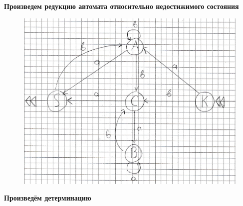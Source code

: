 \documentclass[a4paper, 14pt]{extarticle}
\begin{document}
\vfill

\newpage

\begin{center}
  \normalsize
  \bfseries
  Произведем редукцию автомата относительно недостижимого состояния
\end{center}

\begin{figure}[h]
  \centering
  \includegraphics[width=1\textwidth,height=1\textheight,keepaspectratio]{three}
\end{figure}

\newpage

\begin{center}
  \normalsize
  \bfseries
  Произведём детерминацию
\end{center}
\end{document}
